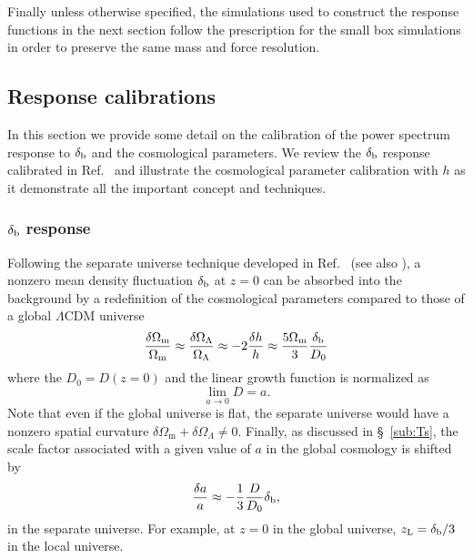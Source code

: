 \documentclass[prd,twocolumn,amsmath,amssymb,floatfix,superscriptaddress]{revtex4-1}
\newcommand{\Omegam}{{\Omega_\textrm{m}}}
\newcommand{\OmegaL}{{\Omega_\Lambda}}
\newcommand{\OmegaK}{{\Omega_K}}
\newcommand{\br}{{\rm b}}
\begin{document}
{{Finally unless otherwise specified, the simulations used to construct the
response functions in the next section follow the prescription for 
the  small  box simulations in order to preserve the same mass and force resolution.







\subsection{Response calibrations}
\label{sec:response}

In this section we provide some detail on the calibration of the power spectrum response
to $\delta_\br$ and the cosmological parameters.   We review the $\delta_\br$ response
calibrated in Ref.~\cite{Lietal:14} and illustrate the cosmological parameter calibration with
$h$ as it demonstrate all the important concept and techniques.

\subsubsection{$\delta_\br$ response}
\label{sub:SU}

Following the separate universe technique {developed in Ref.~\cite{Lietal:14}}
(see also \cite{Sirko:05,Baldauf:2011bh,Gnedin:2011kj}),
a nonzero mean density fluctuation $\delta_\br$ at $z=0$ can be absorbed into the background by 
a redefinition of the cosmological parameters 
compared to those of a global $\Lambda$CDM universe
\begin{equation}
    \frac{\delta\Omegam}{\Omegam}
    \approx \frac{\delta\OmegaL}{\OmegaL}
    \approx -2 \frac{\delta h}{h}
    \approx \frac{5\Omegam}{3} \frac{\delta_\br}{D_0}
    \label{eq:SU}
\end{equation}
where the $D_0=D(z=0)$ and the  linear growth function is normalized as
\begin{equation}
    \lim_{a\to0} D = a.
\end{equation}
Note that even if the global universe is flat,
the separate universe would have a nonzero spatial curvature $\delta\Omegam+\delta\OmegaL \ne 0$.  Finally, as discussed in \S~\ref{sub:Ts}, the scale factor 
associated with a given value of $a$ in the global cosmology is shifted by
\begin{equation}
    \frac{\delta a}{a} \approx -\frac{1}{3}\frac{D}{D_0}\delta_\br,
\end{equation}
in the separate universe.   For example, at $z=0$ in the global universe, 
{$z_\textrm{L} = \delta_{\br}/3$} in the local universe.

}}
\end{document}
